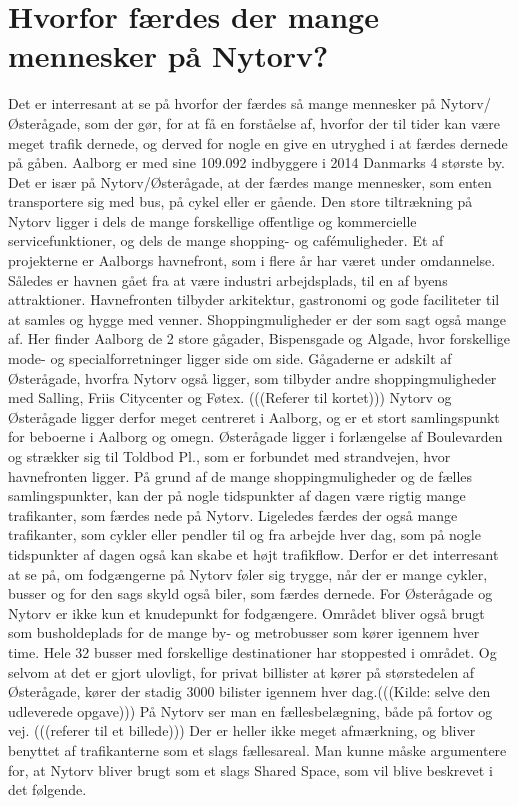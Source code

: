 \section{Hvorfor færdes der mange mennesker på Nytorv?}
\label{sec:hvorfor_faerdes_der_mange_mennesker_paa_nytorv?}
Det er interresant at se på hvorfor der færdes så mange mennesker på Nytorv/Østerågade, som der gør, for at få en forståelse af, hvorfor der til tider kan være meget trafik dernede, og derved for nogle en give en utryghed i at færdes dernede på gåben.
Aalborg er med sine 109.092 indbyggere i 2014 Danmarks 4 største by.%
Det er især på Nytorv/Østerågade, at der færdes mange mennesker, som enten transportere sig med bus, på cykel eller er gående. Den store tiltrækning på Nytorv ligger i dels de mange forskellige offentlige og kommercielle servicefunktioner, og dels de mange shopping- og cafémuligheder. 
Et af projekterne er Aalborgs havnefront, som i flere år har været under omdannelse. Således er havnen gået fra at være industri arbejdsplads, til en af byens attraktioner. Havnefronten tilbyder arkitektur, gastronomi og gode faciliteter til at samles og hygge med venner.
Shoppingmuligheder er der som sagt også mange af. Her finder Aalborg de 2 store gågader, Bispensgade og Algade, hvor forskellige mode- og specialforretninger ligger side om side. Gågaderne er adskilt af Østerågade, hvorfra Nytorv også ligger, som tilbyder andre shoppingmuligheder med Salling, Friis Citycenter og Føtex. (((Referer til kortet)))
Nytorv og Østerågade ligger derfor meget centreret i Aalborg, og er et stort samlingspunkt for beboerne i Aalborg og omegn. Østerågade ligger i forlængelse af Boulevarden og strækker sig til Toldbod Pl., som er forbundet med strandvejen, hvor havnefronten ligger. På grund af de mange shoppingmuligheder og de fælles samlingspunkter, kan der på nogle tidspunkter af dagen være rigtig mange trafikanter, som færdes nede på Nytorv. Ligeledes færdes der også mange trafikanter, som cykler eller pendler til og fra arbejde hver dag, som på nogle tidspunkter af dagen også kan skabe et højt trafikflow. Derfor er det interresant at se på, om fodgængerne på Nytorv føler sig trygge, når der er mange cykler, busser og for den sags skyld også biler, som færdes dernede. For Østerågade og Nytorv er ikke kun et knudepunkt for fodgængere. Området bliver også brugt som busholdeplads for de mange by- og metrobusser som kører igennem hver time. Hele 32 busser med forskellige destinationer har stoppested i området. Og selvom at det er gjort ulovligt, for privat billister at kører på størstedelen af Østerågade, kører der stadig 3000 bilister igennem hver dag.(((Kilde: selve den udleverede opgave)))  På Nytorv ser man en fællesbelægning, både på fortov og vej. (((referer til et billede))) Der er heller ikke meget afmærkning, og bliver benyttet af trafikanterne som et slags fællesareal. Man kunne måske argumentere for, at Nytorv bliver brugt som et slags Shared Space, som vil blive beskrevet i det følgende. 